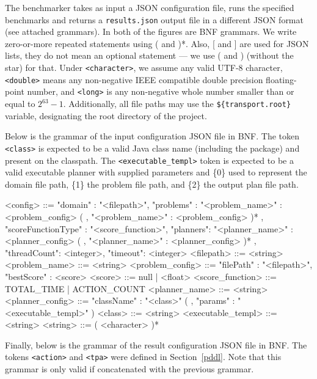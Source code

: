 The benchmarker takes as input a JSON \citep{Bray2014} configuration file,
runs the specified benchmarks and returns a \texttt{results.json} output file in a different JSON format  (see attached grammars).
In both of the figures are BNF grammars. We write zero-or-more repeated statements using ( and )*. Also, [ and ] are used for JSON lists, they do not mean an optional statement --- we use ( and ) (without the star) for that.
Under \texttt{<character>}, we assume any valid UTF-8 character,
\texttt{<double>} means any non-negative IEEE compatible double precision floating-point number,
and \texttt{<long>} is any non-negative whole number smaller than or equal to $2^{63}-1$.
Additionally, all file paths may use the \verb+${transport.root}+ variable, designating the
root directory of the project.

Below is the grammar of the input configuration JSON file in BNF. The token \texttt{<class>}
is expected to be a valid Java class name (including the package) and present on the classpath.
The \texttt{<executable\_templ>} token is expected to be a valid executable planner with supplied parameters
and \{0\} used to represent the domain file path, \{1\} the problem file path, and \{2\} the output plan file path.

\begin{codesmall}
<config> ::= { "domain" : "<filepath>",
               "problems" : { "<problem_name>" : <problem_config>
                          ( , "<problem_name>" : <problem_config> )* },
               "scoreFunctionType"  : "<score_function>",
               "planners": { "<planner_name>" : <planner_config>
                         ( , "<planner_name>" : <planner_config> )* },
               "threadCount": <integer>,
               "timeout": <integer> }
<filepath> ::= <string>
<problem_name> ::= <string>
<problem_config> ::= { "filePath" : "<filepath>",
                       "bestScore" : <score> }
<score> ::= null | <float>
<score_function> ::= TOTAL_TIME | ACTION_COUNT
<planner_name> ::= <string>
<planner_config> ::= { "className" : "<class>"
                   ( , "params" : "<executable_templ>" ) }
<class> ::= <string>
<executable_templ> ::= <string>
<string> ::= ( <character> )*
\end{codesmall}

Finally, below is the grammar of the result configuration JSON file in BNF.
The tokens \texttt{<action>} and \texttt{<tpa>} were defined in Section~\ref{pddl}. Note
that this grammar is only valid if concatenated with the previous grammar.

